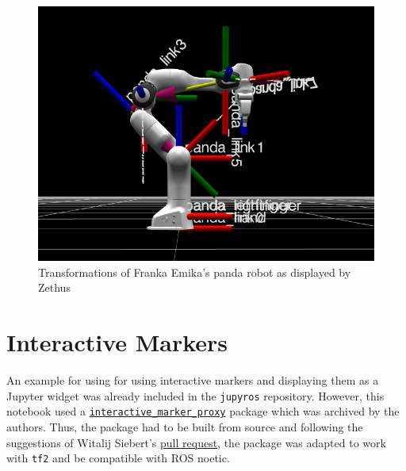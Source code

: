 \begin{figure}[H]
    \centering
    \includegraphics[width=0.6\linewidth]{Images/04_panda2.png}
    \caption{Transformations of Franka Emika's panda robot as displayed by Zethus}
    \label{fig:panda}
\end{figure}


\section{Interactive Markers}

    An example for using for using interactive markers and displaying them as a Jupyter widget was already included in the \texttt{jupyros} repository. However, this notebook used a \href{https://github.com/RobotWebTools/interactive_marker_proxy}{\texttt{interactive\_marker\_proxy}} package which was archived by the authors. Thus, the package had to be built from source and following the suggestions of Witalij Siebert's \href{https://github.com/RobotWebTools/interactive_marker_proxy/pull/4}{pull request}, the package was adapted to work with \texttt{tf2} and be compatible with ROS noetic.

